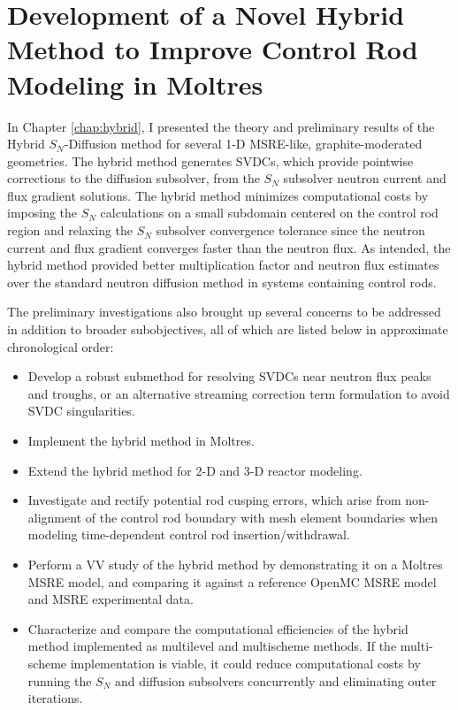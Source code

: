 \section{Development of a Novel Hybrid Method to Improve Control Rod Modeling in Moltres}

In Chapter \ref{chap:hybrid}, I presented the theory and preliminary results of the Hybrid
$S_N$-Diffusion method for several 1-D \gls{MSRE}-like, graphite-moderated geometries. The hybrid
method generates \glspl{SVDC}, which provide pointwise corrections to the diffusion subsolver, from
the $S_N$ subsolver neutron current and flux gradient solutions. The hybrid method minimizes
computational costs by imposing the $S_N$ calculations on a small subdomain centered on the control
rod region and relaxing the $S_N$ subsolver convergence tolerance since the neutron current and
flux gradient converges faster than the neutron flux. As intended,
the hybrid method provided better multiplication factor and neutron flux estimates over the
standard neutron diffusion method in systems containing control rods.

The preliminary investigations also brought up several concerns to be addressed in addition to
broader subobjectives, all of which are listed below in approximate chronological order:
%
\begin{itemize}
  \item Develop a robust submethod for resolving \glspl{SVDC} near neutron flux peaks and troughs,
    or an alternative streaming correction term formulation to avoid \gls{SVDC} singularities.
  \item Implement the hybrid method in Moltres.
  \item Extend the hybrid method for 2-D and 3-D reactor modeling.
  \item Investigate and rectify potential rod cusping errors, which arise from non-alignment of
    the control rod boundary with mesh element boundaries when modeling time-dependent control rod
    insertion/withdrawal.
  \item Perform a \gls{VV} study of the hybrid method by demonstrating it on a Moltres
    \gls{MSRE} model, and comparing it against a reference OpenMC \gls{MSRE} model and \gls{MSRE}
    experimental data.
  \item Characterize and compare the computational efficiencies of the hybrid method implemented as
    multilevel and multischeme methods. If the multi-scheme implementation is viable, it could
    reduce computational costs by running the $S_N$ and diffusion subsolvers concurrently and
    eliminating outer iterations.
\end{itemize}

